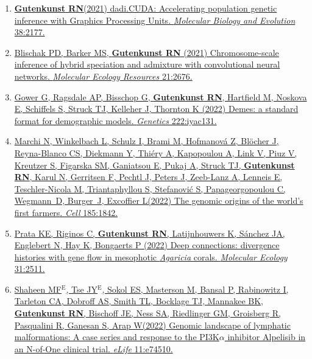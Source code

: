\documentclass[11pt]{article}
\begin{document}
\begin{enumerate}
\item \href{https://doi.org/10.1093/molbev/msaa305}{\textbf{Gutenkunst RN}\corresponding (2021) dadi.CUDA: Accelerating population genetic inference with Graphics Processing Units. \emph{Molecular Biology and Evolution} 38:2177.}

\item \href{https://doi.org/10.1111/1755-0998.13355}{Blischak PD\trainee\corresponding, Barker MS, \textbf{Gutenkunst RN} (2021) Chromosome-scale inference of hybrid speciation and admixture with convolutional neural networks. \emph{Molecular Ecology Resources} 21:2676.}

\item \href{https://doi.org/10.1093/genetics/iyac131}{Gower G\equal, Ragsdale AP\equal, Bisschop G, \textbf{Gutenkunst RN}, Hartfield M, Noskova E, Schiffels S, Struck TJ\trainee, Kelleher J\corresponding, Thornton K (2022) Demes: a standard format for demographic models. \emph{Genetics} 222:iyac131.}

\item \href{https://doi.org/10.1016/j.cell.2022.04.008}{Marchi N\equal, Winkelbach L\equal, Schulz I\equal, Brami M\equal, Hofmanov\'a Z, Bl\"ocher J,
Reyna-Blanco CS, Diekmann Y, Thi\'ery A, Kapopoulou A, Link V, Piuz V, Kreutzer S, Figarska SM, Ganiatsou E, Pukaj A, Struck TJ\trainee, \textbf{Gutenkunst RN}, Karul N, Gerritsen F, Pechtl J, Peters J, Zeeb-Lanz A,
Lenneis E, Teschler-Nicola M, Triantaphyllou S, Stefanovi\'c S, Papageorgopoulou C, Wegmann~D\corresponding, Burger~J\corresponding, Excoffier L\corresponding (2022)
The genomic origins of the world’s first farmers. \emph{Cell} 185:1842.}

\item \href{https://doi.org/10.1111/mec.16391}{Prata KE\corresponding, Riginos C, \textbf{Gutenkunst RN}, Latijnhouwers K, Sánchez JA, Englebert N, Hay K, Bongaerts P (2022) Deep connections: divergence histories with gene flow in mesophotic \emph{Agaricia} corals. \emph{Molecular Ecology} 31:2511.}

\item \href{https://doi.org/10.7554/eLife.74510}{Shaheen MF$^\mathrm{E}$\corresponding, Tse JY$^\mathrm{E}$\corresponding, Sokol ES, Masterson M, Bansal P, Rabinowitz I, Tarleton CA, Dobroff AS, Smith TL, Bocklage TJ, Mannakee BK\trainee, \textbf{Gutenkunst RN}, Bischoff JE, Ness SA, Riedlinger GM, Groisberg R, Pasqualini R, Ganesan S\corresponding, Arap W\corresponding (2022)
Genomic landscape of lymphatic malformations: A case series and response to the PI3K$\alpha$ inhibitor Alpelisib in an N-of-One clinical trial. \emph{eLife} 11:e74510.}


\end{enumerate}
\end{document}
